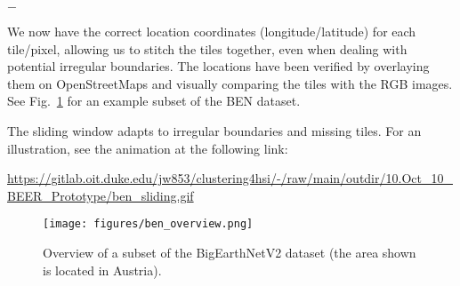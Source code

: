 
\begin{list}{$-$}{}
\item {} We now have the correct 
  location coordinates (longitude/latitude) for each tile/pixel, allowing 
  us to stitch the tiles together, even when dealing with potential irregular 
  boundaries. The locations have been verified by overlaying them on 
  OpenStreetMaps and visually comparing the tiles with the RGB images. 
  See Fig.~\ref{fig:ben_overview} for an example subset of the BEN dataset.

\item {} The sliding window adapts to irregular boundaries and 
  missing tiles. For an illustration, see the animation at the following link:

  \url{https://gitlab.oit.duke.edu/jw853/clustering4hsi/-/raw/main/outdir/10.Oct_10_BEER_Prototype/ben_sliding.gif}
  
\end{list}

\begin{figure}[!htpb]
  \centering
  \texttt{[image: figures/ben\_overview.png]}
  \caption{Overview of a subset of the BigEarthNetV2 dataset (the area
    shown is located in Austria).}
  \label{fig:ben_overview}
\end{figure}

\newpage